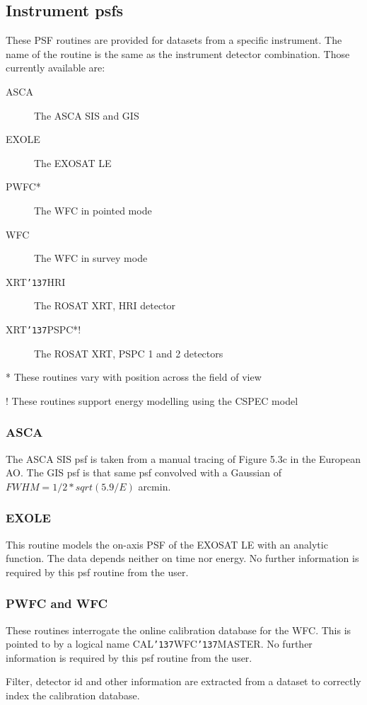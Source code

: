 \documentclass{book}
\renewcommand{\_}{{\tt\char'137}}     %
\begin{document}
\subsection{Instrument psfs}
These PSF routines are provided for datasets from a specific
instrument. The name of the routine is the same as the instrument
detector combination. Those currently available are:
 
 
\begin{description}
\item[ASCA]
The ASCA SIS and GIS
\item[EXOLE]
The EXOSAT LE
\item[PWFC*]
The WFC in pointed mode
\item[WFC]
The WFC in survey mode
\item[XRT\_HRI]
The ROSAT XRT, HRI detector
\item[XRT\_PSPC*!]
The ROSAT XRT, PSPC 1 and 2 detectors
\end{description}
* These routines vary with position across the field of view
 
! These routines support energy modelling using the CSPEC model
 
\subsubsection{ASCA}
The ASCA SIS psf is taken from a manual tracing of Figure 5.3c in the
European AO. The GIS psf is that same psf convolved with a Gaussian
of $FWHM = 1/2 * sqrt(5.9/E)$ arcmin.
 
\subsubsection{EXOLE}
This routine models the on-axis PSF of the EXOSAT LE with an
analytic function. The data depends neither on time nor energy.
No further information is required by this psf routine from the
user.
 
\subsubsection{PWFC and WFC}
These routines interrogate the online calibration database for
the WFC. This is pointed to by a logical name CAL\_WFC\_MASTER.
No further information is required by this psf routine from the
user.
 
Filter, detector id and other information are extracted from a
dataset to correctly index the calibration database.
 
\end{document}

